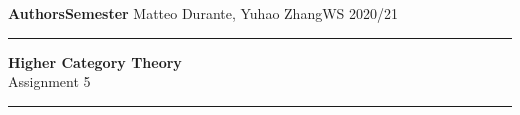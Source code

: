 \documentclass[a4paper,11pt,openany]{scrartcl}
\begin{document}
\noindent\textbf{Authors}\hfill\textbf{Semester} \linebreak
\vspace*{-.1cm} Matteo Durante, Yuhao Zhang\hfill WS 2020/21 \\

\noindent
\rule{\linewidth}{1pt}
\begin{center}
\Large
\textbf{Higher Category Theory} \\
Assignment 5
\end{center}
\rule{\linewidth}{1pt}
\\


\newcommand{\La}{\Lambda}
\newcommand{\pa}{\partial}
\newcommand{\ob}{\operatorname{Ob}}
\newcommand{\mor}{\operatorname{Mor}}
\newcommand{\sto}{\twoheadrightarrow}

\newcommand{\plim}{\varprojlim}
\newcommand{\sst}{\subseteq}
\newcommand{\eq}{\operatorname{eq}}

\newcommand{\f}{\varphi}
\end{document}
